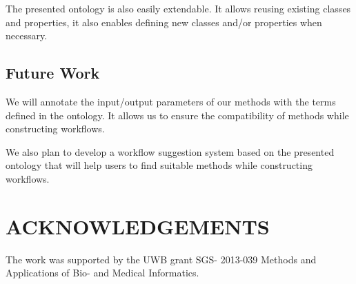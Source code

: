\documentclass[a4paper,twoside]{article}
\begin{document}
The presented ontology is also easily extendable. It allows reusing existing classes and properties, it also enables defining new classes and/or properties when necessary.

\subsection{Future Work}
\noindent We will annotate the input/output parameters of our methods with the terms defined in the ontology. It allows us to ensure the compatibility of methods while constructing workflows.

We also plan to develop a workflow suggestion system based on the presented ontology that will help users to find suitable methods while constructing workflows.


\section*{\uppercase{Acknowledgements}}

\noindent The work was supported by the UWB grant SGS-
2013-039 Methods and Applications of Bio- and
Medical Informatics.


\vfill

{\small
}



\vfill
\end{document}
